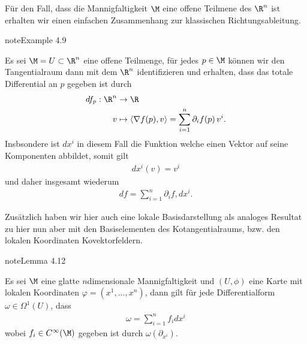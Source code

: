 \documentclass[letterpaper,10pt,german]{jupyterBook}
\begin{document}
\sphinxAtStartPar
Für den Fall, dass die Mannigfaltigkeit \(\M\) eine offene Teilmene des \(\R^n\) ist erhalten wir einen einfachen Zusammenhang zur klassischen Richtungsableitung.
\label{manifolds/tangential:example-40}
\begin{sphinxadmonition}{note}{Example 4.9}



\sphinxAtStartPar
Es sei \(\M=U\subset\R^n\) eine offene Teilmenge, für jedes \(p\in\M\) können wir den Tangentialraum dann mit dem \(\R^n\) identifizieren und erhalten, dass das totale Differential an \(p\) gegeben ist durch
\begin{equation*}
\begin{split}df_p:\R^n&\to\R\\
v&\mapsto \langle \nabla f(p), v \rangle = \sum_{i=1}^n \partial_i f(p)\, v^i.\end{split}
\end{equation*}
\sphinxAtStartPar
Insbsondere ist \(dx^{i}\) in diesem Fall die Funktion welche einen Vektor auf seine Komponenten abbildet, somit gilt
\begin{equation*}
\begin{split}dx^{i}(v) = v^i\end{split}
\end{equation*}
\sphinxAtStartPar
und daher insgesamt wiederum
\begin{equation*}
\begin{split}df = \sum_{i=1}^n \partial_i f, dx^{i}.\end{split}
\end{equation*}\end{sphinxadmonition}

\sphinxAtStartPar
Zusätzlich haben wir hier auch eine lokale Basisdarstellung als analoges Resultat zu {\hyperref[\detokenize{manifolds/tangential:lem:localsections}]{}} hier nun aber mit den Basiselementen des Kotangentialraums, bzw. den lokalen Koordinaten Kovektorfeldern.
\label{manifolds/tangential:lem:coordcovec}
\begin{sphinxadmonition}{note}{Lemma 4.12}



\sphinxAtStartPar
Es sei \(\M\) eine glatte \(n\)\sphinxhyphen{}dimensionale Mannigfaltigkeit und \((U,\phi)\) eine Karte mit lokalen Koordinaten \(\varphi=(x^1,\ldots, x^n)\),  dann gilt für jede Differentialform \(\omega\in\Omega^1(U)\), dass
\begin{equation*}
\begin{split}\omega = \sum_{i=1}^n f_i dx^i\end{split}
\end{equation*}
\sphinxAtStartPar
wobei \(f_i\in C^\infty(\M)\) gegeben ist durch \(\omega(\partial_{x^i})\).
\end{sphinxadmonition}
\end{document}
